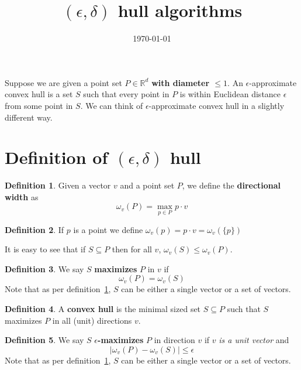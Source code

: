 \documentclass[12pt]{article}
\theoremstyle{definition}
\newtheorem{definition}{Definition}[section]
\theoremstyle{lemma}
\theoremstyle{theorem}
\begin{document}
\title{$(\epsilon, \delta)$ hull algorithms}         %
\date{\today}          %
\maketitle

Suppose we are given a point set $P \in \mathbb{R}^d$ \textbf{with diameter $\leq 1$}. An $\epsilon$-approximate convex hull is a set $S$ such that every point in $P$ is within Euclidean distance $\epsilon$ from some point in $S$. We can think of $\epsilon$-approximate convex hull in a slightly different way.

\section{Definition of $(\epsilon, \delta)$ hull}

\begin{definition}
Given a vector $v$ and a point set $P$, we define the \textbf{directional width} as
\[ \omega_v(P) = \max_{p \in P} p \cdot v \]
\label{def:dir_width}
\end{definition}
\begin{definition}
If $p$ is a point we define $\omega_v(p) = p \cdot v = \omega_v(\{p\})$
\end{definition}

It is easy to see that if $S \subseteq P$ then for all $v$, $\omega_v(S) \leq \omega_v(P)$.

\begin{definition}
We say $S$ \textbf{maximizes} $P$ in $v$ if
\[ \omega_v(P) = \omega_v(S) \]
Note that as per definition~\ref{def:dir_width}, $S$ can be either a single vector or a set of vectors.
\end{definition}

\begin{definition}
A \textbf{convex hull} is the minimal sized set $S \subseteq P$ such that $S$ maximizes $P$ in all (unit) directions $v$.
\end{definition}

\begin{definition}
We say $S$ \textbf{$\epsilon$-maximizes} $P$ in direction $v$ if $v$ \emph{is a unit vector} and
\[ |\omega_v(P) - \omega_v(S)| \leq \epsilon \]
Note that as per definition~\ref{def:dir_width}, $S$ can be either a single vector or a set of vectors.
\end{definition}
\end{document}

